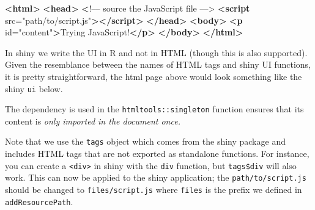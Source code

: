 \documentclass[
]{krantz}
\makeatletter
\newenvironment{Shaded}{\begin{snugshade}}{\end{snugshade}}
\newcommand{\DataTypeTok}[1]{\textcolor[rgb]{0.27,0.27,0.27}{#1}}
\newcommand{\ErrorTok}[1]{\textcolor[rgb]{0.14,0.14,0.14}{\textbf{#1}}}
\newcommand{\KeywordTok}[1]{\textcolor[rgb]{0.27,0.27,0.27}{\textbf{#1}}}
\newcommand{\NormalTok}[1]{#1}
\newcommand{\OperatorTok}[1]{\textcolor[rgb]{0.43,0.43,0.43}{\textbf{#1}}}
\newcommand{\OtherTok}[1]{\textcolor[rgb]{0.37,0.37,0.37}{#1}}
\newcommand{\StringTok}[1]{\textcolor[rgb]{0.5,0.5,0.5}{#1}}
\newenvironment{kframe}{%
\medskip{}
\setlength{\fboxsep}{.8em}
 \def\at@end@of@kframe{}%
 \ifinner\ifhmode%
  \def\at@end@of@kframe{\end{minipage}}%
  \begin{minipage}{\columnwidth}%
 \fi\fi%
 \def\FrameCommand##1{\hskip\@totalleftmargin \hskip-\fboxsep
 \colorbox{shadecolor}{##1}\hskip-\fboxsep
     \hskip-\linewidth \hskip-\@totalleftmargin \hskip\columnwidth}%
 \MakeFramed {\advance\hsize-\width
   \@totalleftmargin\z@ \linewidth\hsize
   \@setminipage}}%
 {\par\unskip\endMakeFramed%
 \at@end@of@kframe}
\renewenvironment{Shaded}{\begin{kframe}}{\end{kframe}}
\makeatother
\begin{document}
\begin{Shaded}
\begin{Highlighting}[]
\KeywordTok{<html>}
  \KeywordTok{<head>}
    \ErrorTok{<}\NormalTok{!–– source the JavaScript file ––>}
    \KeywordTok{<script}\OtherTok{ src=}\StringTok{"path/to/script.js"}\KeywordTok{></script>}
  \KeywordTok{</head>}
  \KeywordTok{<body>}
    \KeywordTok{<p}\OtherTok{ id=}\StringTok{"content"}\KeywordTok{>}\NormalTok{Trying JavaScript!}\KeywordTok{</p>}
  \KeywordTok{</body>}
\KeywordTok{</html>}
\end{Highlighting}
\end{Shaded}

In shiny we write the UI in R and not in HTML (though this is also supported). Given the resemblance between the names of HTML tags and shiny UI functions, it is pretty straightforward, the html page above would look something like the shiny \texttt{ui} below.

\begin{Shaded}
\end{Shaded}

The dependency is used in the \texttt{htmltools::singleton} function ensures that its content is \emph{only imported in the document once.}

Note that we use the \texttt{tags} object which comes from the shiny package and includes HTML tags that are not exported as standalone functions. For instance, you can create a \texttt{\textless{}div\textgreater{}} in shiny with the \texttt{div} function, but \texttt{tags\$div} will also work. This can now be applied to the shiny application; the \texttt{path/to/script.js} should be changed to \texttt{files/script.js} where \texttt{files} is the prefix we defined in \texttt{addResourcePath}.
\end{document}
